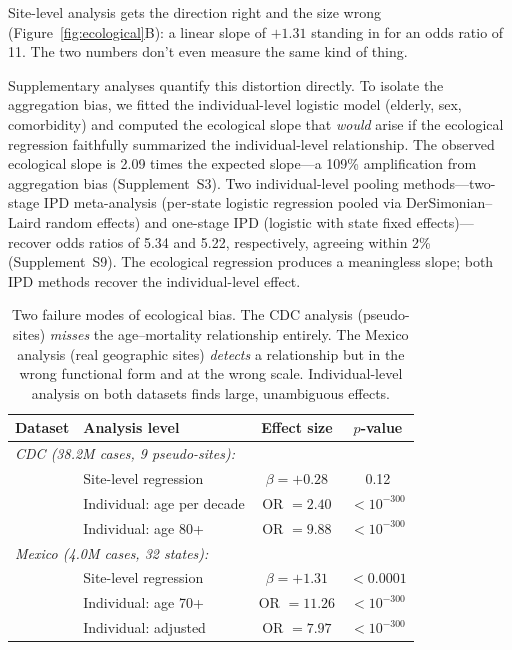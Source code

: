 \documentclass{article}
\begin{document}
Site-level analysis gets the direction right and the size wrong (Figure~\ref{fig:ecological}B): a linear
slope of $+1.31$ standing in for an odds ratio of 11.  The two numbers
don't even measure the same kind of thing.

Supplementary analyses quantify this distortion directly.  To isolate the
aggregation bias, we fitted the individual-level logistic model
(elderly, sex, comorbidity) and computed the ecological slope that
\emph{would} arise if the ecological regression faithfully summarized the
individual-level relationship.  The observed ecological slope is 2.09 times
the expected slope---a 109\% amplification from aggregation bias
(Supplement~S3).  Two individual-level pooling methods---two-stage IPD
meta-analysis (per-state logistic regression pooled via DerSimonian--Laird
random effects) and one-stage IPD (logistic with state fixed
effects)---recover odds ratios of 5.34 and 5.22, respectively, agreeing
within 2\% (Supplement~S9).  The ecological regression produces a
meaningless slope; both IPD methods recover the individual-level effect.

\begin{table}[t]
\centering
\caption{Two failure modes of ecological bias.  The CDC analysis (pseudo-sites)
\emph{misses} the age--mortality relationship entirely.  The Mexico analysis
(real geographic sites) \emph{detects} a relationship but in the wrong
functional form and at the wrong scale.  Individual-level analysis on both
datasets finds large, unambiguous effects.}
\label{tab:ecological}
\begin{tabular}{llcc}
\toprule
Dataset & Analysis level & Effect size & $p$-value \\
\midrule
\multicolumn{4}{l}{\emph{CDC (38.2M cases, 9 pseudo-sites):}} \\
& Site-level regression & $\beta = +0.28$ & 0.12 \\
& Individual: age per decade & OR $= 2.40$ & $< 10^{-300}$ \\
& Individual: age 80+ & OR $= 9.88$ & $< 10^{-300}$ \\
\midrule
\multicolumn{4}{l}{\emph{Mexico (4.0M cases, 32 states):}} \\
& Site-level regression & $\beta = +1.31$ & $< 0.0001$ \\
& Individual: age 70+ & OR $= 11.26$ & $< 10^{-300}$ \\
& Individual: adjusted & OR $= 7.97$ & $< 10^{-300}$ \\
\bottomrule
\end{tabular}
\end{table}
\end{document}
